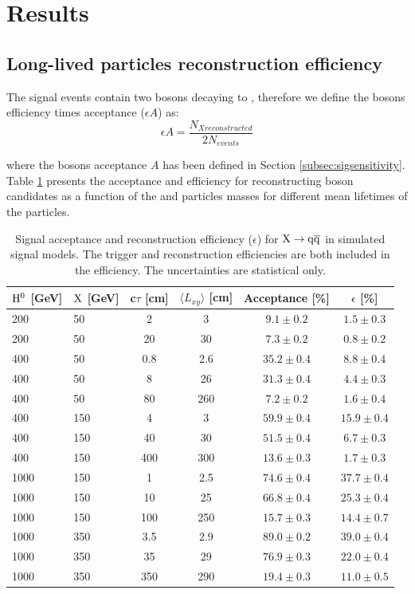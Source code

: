 \section{Results}
\label{sec:results}

\subsection{Long-lived particles reconstruction efficiency}
\label{subsec:signalefficiency}

The signal events contain two \X bosons decaying to \qq, therefore we define the \X bosons 
 efficiency times acceptance ($\epsilon A$) as:
\begin{equation}
\epsilon A= \frac{N_{X reconstructed}}{2N_{events}}
\end{equation}

where the \X bosons acceptance $A$ has been defined in Section \ref{subsec:sigsensitivity}. 
Table \ref{tab:sigeff} presents the acceptance and efficiency for
reconstructing \X boson candidates as a function of the \Higgs and \X particles masses for different 
mean lifetimes of the \X particles.

\begin{table}[htbp]
\caption{
Signal acceptance and reconstruction efficiency ($\epsilon$) for $\X \to \qq$ in simulated signal models.
The trigger and reconstruction efficiencies are both included in the efficiency.
The uncertainties are statistical only.\label{tab:sigeff}}
\centering
\begin{tabular}{llcccc}
\hline
$\mathrm{H}^{0}$ [GeV] & $\mathrm{X}$ [GeV] & c$\tau$ [cm] & $\langle L_{xy} \rangle$ [cm] & Acceptance [\%] & $\epsilon$ [\%] \\
\hline
200 & 50 & 2 & 3 & $9.1\pm0.2$ & $1.5\pm0.3$ \\
200 & 50 & 20 & 30 & $7.3\pm0.2$ & $0.8\pm0.2$ \\
\hline
400 & 50 & 0.8 & 2.6 & $35.2\pm0.4$ & $8.8\pm0.4$ \\
400 & 50 & 8 & 26 & $31.3\pm0.4$ & $4.4\pm0.3$ \\
400 & 50 & 80 & 260 & $7.2\pm0.2$ & $1.6\pm0.4$ \\
\hline
400 & 150 & 4 & 3 & $59.9\pm0.4$ & $15.9\pm0.4$ \\
400 & 150 & 40 & 30 & $51.5\pm0.4$ & $6.7\pm0.3$ \\
400 & 150 & 400 & 300 & $13.6\pm0.3$ & $1.7\pm0.3$ \\
\hline 
1000 & 150 & 1 & 2.5 & $74.6\pm0.4$ & $37.7\pm0.4$ \\
1000 & 150 & 10 & 25 & $66.8\pm0.4$ & $25.3\pm0.4$ \\ 
1000 & 150 & 100 & 250 & $15.7\pm0.3$ & $14.4\pm0.7$ \\
\hline 
1000 & 350 & 3.5 & 2.9 & $89.0\pm0.2$ & $39.0\pm0.4$ \\
1000 & 350 & 35 & 29 & $76.9\pm0.3$ & $22.0\pm0.4$ \\
1000 & 350 & 350 & 290 & $19.4\pm0.3$ & $11.0\pm0.5$ \\
\hline
\end{tabular}
\end{table}

